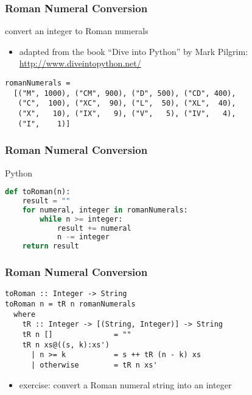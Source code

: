\documentclass[dvipsnames]{beamer}
\theoremstyle{plain}
\begin{document}
\begin{frame}[fragile]
  \frametitle{Roman Numeral Conversion}


  \begin{exampleblock}{convert an integer to Roman numerals}
    \begin{itemize}
      \item adapted from the book ``Dive into Python'' by Mark Pilgrim:\\
        \url{http://www.diveintopython.net/}
    \end{itemize}

    \medskip
    \begin{lstlisting}
romanNumerals =
  [("M", 1000), ("CM", 900), ("D", 500), ("CD", 400),
   ("C",  100), ("XC",  90), ("L",  50), ("XL",  40),
   ("X",   10), ("IX",   9), ("V",   5), ("IV",   4),
   ("I",    1)]
    \end{lstlisting}
  \end{exampleblock}
\end{frame}

\begin{frame}[fragile]
  \frametitle{Roman Numeral Conversion}

  \begin{exampleblock}{Python}
    \begin{lstlisting}[language=Python]
def toRoman(n):
    result = ""
    for numeral, integer in romanNumerals:
        while n >= integer:
            result += numeral
            n -= integer
    return result
    \end{lstlisting}
  \end{exampleblock}
\end{frame}

\begin{frame}[fragile]
  \frametitle{Roman Numeral Conversion}

  \begin{exampleblock}{}
    \begin{lstlisting}
toRoman :: Integer -> String
toRoman n = tR n romanNumerals
  where
    tR :: Integer -> [(String, Integer)] -> String
    tR n []              = ""
    tR n xs@((s, k):xs')
      | n >= k           = s ++ tR (n - k) xs
      | otherwise        = tR n xs'
    \end{lstlisting}
  \end{exampleblock}

  \pause
  \begin{itemize}
    \item exercise: convert a Roman numeral string into an integer
  \end{itemize}
\end{frame}
\end{document}
